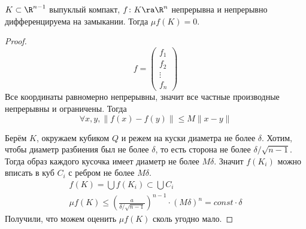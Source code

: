 \begin{lemma}
	$K \subset \R^{n-1}$ выпуклый компакт, $f\colon K \ra \R^n$ непрерывна и непрерывно дифференцируема на замыкании.
	Тогда $\mu f(K) = 0$.
\end{lemma}
\begin{proof}
	\[ f = \begin{pmatrix}f_1 \\ f_2 \\ \vdots \\ f_n\end{pmatrix} \]
	Все координаты равномерно непрерывны, значит все частные производные непрерывны и ограничены.
	Тогда
	\[ \forall x, y, \|f(x) - f(y)\| \le M \|x - y\| \]

	Берём $K$, окружаем кубиком $Q$ и режем на куски диаметра не более $\delta$.
	Хотим, чтобы диаметр разбиения был не более $\delta$, то есть сторона не более $\delta / \sqrt{n-1}$.
	Тогда образ каждого кусочка имеет диаметр не более $M\delta$.
	Значит $f(K_i)$ можно вписать в куб $C_i$ с ребром не более $M\delta$.
	\begin{gather*}
		f(K) = \bigcup f(K_i) \subset \bigcup C_i \\
		\mu f(K) \le \left( \frac{a}{\delta / \sqrt{n-1}} \right)^{n-1} \cdot \left(M\delta\right)^n = const \cdot \delta
	\end{gather*}
	Получили, что можем оценить $\mu f(K)$ сколь угодно мало.
\end{proof}

